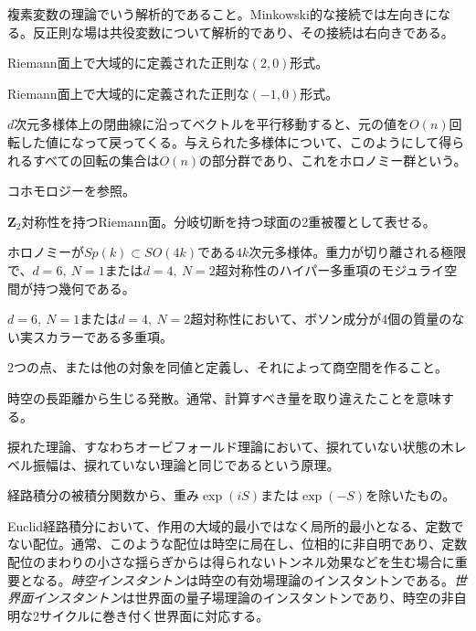 {複素変数の理論でいう解析的であること。Minkowski的な接続では左向きになる。反正則な場は共役変数について解析的であり、その接続は右向きである。}

{Riemann面上で大域的に定義された正則な$(2,0)$形式。}

{Riemann面上で大域的に定義された正則な$(-1,0)$形式。}

{$d$次元多様体上の閉曲線に沿ってベクトルを平行移動すると、元の値を$O(n)$回転した値になって戻ってくる。与えられた多様体について、このようにして得られるすべての回転の集合は$O(n)$の部分群であり、これをホロノミー群という。}

{コホモロジーを参照。}

{$\mathbf Z_2$対称性を持つRiemann面。分岐切断を持つ球面の2重被覆として表せる。}

{ホロノミーが$Sp(k)\subset SO(4k)$である$4k$次元多様体。重力が切り離される極限で、$d=6,\ N=1$または$d=4,\ N=2$超対称性のハイパー多重項のモジュライ空間が持つ幾何である。}

{$d=6,\ N=1$または$d=4,\ N=2$超対称性において、ボソン成分が4個の質量のない実スカラーである多重項。}

{2つの点、または他の対象を同値と定義し、それによって商空間を作ること。}

{時空の長距離から生じる発散。通常、計算すべき量を取り違えたことを意味する。}

{捩れた理論、すなわちオービフォールド理論において、捩れていない状態の木レベル振幅は、捩れていない理論と同じであるという原理。}

{経路積分の被積分関数から、重み$\exp(iS)$または$\exp(-S)$を除いたもの。}

{Euclid経路積分において、作用の大域的最小ではなく局所的最小となる、定数でない配位。通常、このような配位は時空に局在し、位相的に非自明であり、定数配位のまわりの小さな揺らぎからは得られないトンネル効果などを生む場合に重要となる。\emph{時空インスタントン}は時空の有効場理論のインスタントンである。\emph{世界面インスタントン}は世界面の量子場理論のインスタントンであり、時空の非自明な2サイクルに巻き付く世界面に対応する。}

